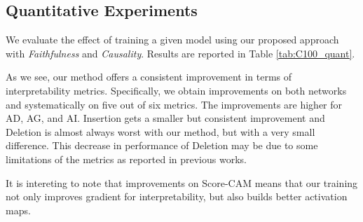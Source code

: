 \subsection{Quantitative Experiments}
We evaluate the effect of training a given model using our proposed approach with \textit{Faithfulness} and \textit{Causality}. Results are reported in Table \ref{tab:C100_quant}.

As we see, our method offers a consistent improvement in terms of interpretability metrics. Specifically, we obtain improvements on both networks and systematically on five out of six metrics. The improvements are higher for AD, AG, and AI. Insertion gets a smaller but consistent improvement and Deletion is almost always worst with our method, but with a very small difference.
This decrease in performance of Deletion may be due to some limitations of the metrics as reported in previous works.%

It is intereting to note that improvements on Score-CAM means that our training not only improves gradient for interpretability, but also builds better activation maps.

